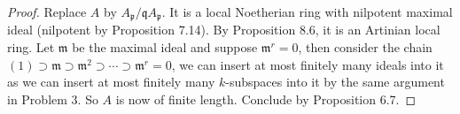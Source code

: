 \documentclass{solution}
\begin{document}
\begin{proof}
    Replace $A$ by $A_\mathfrak{p} / \mathfrak{q} A_{\mathfrak{p}}$. It is a local Noetherian ring with nilpotent maximal ideal (nilpotent by Proposition 7.14). By Proposition 8.6, it is an Artinian local ring. Let $\mathfrak{m}$ be the maximal ideal and suppose $\mathfrak{m}^r = 0$, then consider the chain $(1) \supset \mathfrak{m} \supset \mathfrak{m}^2 \supset \cdots \supset \mathfrak{m}^r = 0$, we can insert at most finitely many ideals into it as we can insert at most finitely many $k$-subspaces into it by the same argument in Problem 3. So $A$ is now of finite length. Conclude by Proposition 6.7.
\end{proof}
\end{document}
